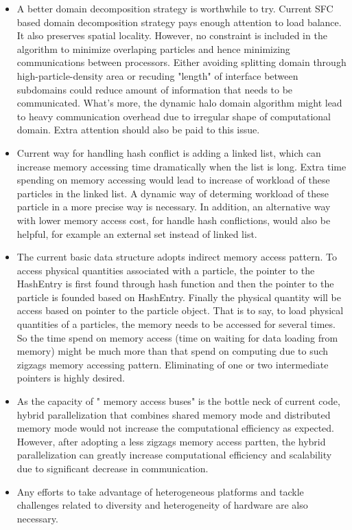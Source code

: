 \begin{itemize}
\item {A better domain decomposition strategy is worthwhile to try. Current SFC based domain decomposition strategy pays enough attention to load balance. It also preserves spatial locality. However, no constraint is included in the algorithm to minimize overlaping particles and hence minimizing communications between processors. Either avoiding splitting domain through high-particle-density area or recuding "length" of interface between subdomains could reduce amount of information that needs to be communicated. What's more, the dynamic halo domain algorithm might lead to heavy communication overhead due to irregular shape of computational domain. Extra attention should also be paid to this issue.}
\item {Current way for handling hash conflict is adding a linked list, which can increase memory accessing time dramatically when the list is long. Extra time spending on memory accessing would lead to increase of workload of these particles in the linked list. A dynamic way of determing workload of these particle in a more precise way is necessary. In addition, an alternative way with lower memory access cost, for handle hash conflictions, would also be helpful, for example an external set instead of linked list.}
\item {The current basic data structure adopts indirect memory access pattern. To access physical quantities associated with a particle, the pointer to the HashEntry is first found through hash function and then the pointer to the particle is founded based on HashEntry. Finally the physical quantity will be access based on pointer to the particle object. That is to say, to load physical quantities of a particles, the memory needs to be accessed for several times.
So the time spend on memory access (time on waiting for data loading from memory) might be much more than that spend on computing due to such zigzags memory accessing pattern. Eliminating of one or two intermediate pointers is highly desired.}
\item {As the capacity of " memory access buses" is the bottle neck of current code, hybrid parallelization that combines shared memory mode and distributed memory mode would not increase the computational efficiency as expected. However, after adopting a less zigzags memory access partten, the hybrid parallelization can greatly increase computational efficiency and scalability due to significant decrease in communication.}
\item {Any efforts to take advantage of heterogeneous platforms and tackle challenges related to diversity and heterogeneity of hardware are also necessary.}
\end{itemize}

